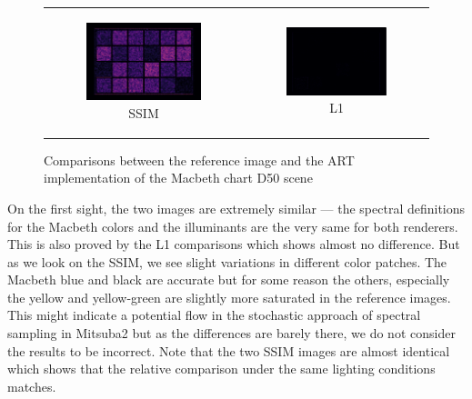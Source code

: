 \begin{figure}[h]
\begin{tabular}{cc}
\begin{subfigure}
			{0.4\textwidth}\centering\includegraphics[width=\linewidth]{img/macbeth_chart_D50_SSIM.png}
			\caption{SSIM}
		\end{subfigure} 
		&
		\begin{subfigure}
			{0.4\textwidth}\centering\includegraphics[width=\linewidth]{img/macbeth_chart_D50_L1.png}
			\caption{L1}
		\end{subfigure}
	\end{tabular}
	\caption{Comparisons between the reference image and the ART implementation of the Macbeth chart D50 scene}
	\label{fig:compare_macbeth_d50}
\end{figure}

On the first sight, the two images are extremely similar --- the spectral definitions for the Macbeth colors and the illuminants are the very same for both renderers. This is also proved by the L1 comparisons which shows almost no difference. But as we look on the SSIM, we see slight variations in different color patches. The Macbeth blue and black are accurate but for some reason the others, especially the yellow and yellow-green are slightly more saturated in the reference images. This might indicate a potential flow in the stochastic approach of spectral sampling in Mitsuba2 but as the differences are barely there, we do not consider the results to be incorrect. Note that the two SSIM images are almost identical which shows that the relative comparison under the same lighting conditions matches.  

